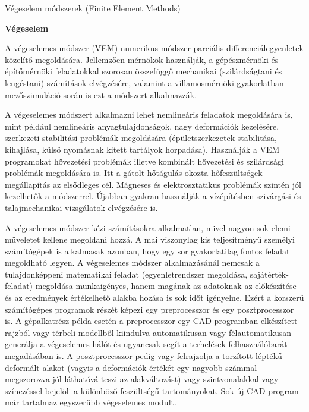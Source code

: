

Végeselem módszerek (Finite Element Methods)

\textbf{Végeselem}

A végeselemes módszer (VEM) numerikus módszer parciális differenciálegyenletek közelítő megoldására. Jellemzően mérnökök használják, a gépészmérnöki és építőmérnöki feladatokkal szorosan összefüggő mechanikai (szilárdságtani és lengéstani) számítások elvégzésére, valamint a villamosmérnöki gyakorlatban mezőszimuláció során is ezt a módszert alkalmazzák.

A végeselemes módszert alkalmazni lehet nemlineáris feladatok megoldására is, mint például nemlineáris anyagtulajdonságok, nagy deformációk kezelésére, szerkezeti stabilitási problémák megoldására (épületszerkezetek stabilitása, kihajlása, külső nyomásnak kitett tartályok horpadása). Használják a VEM programokat hővezetési problémák illetve kombinált hővezetési és szilárdsági problémák megoldására is. Itt a gátolt hőtágulás okozta hőfeszültségek megállapítás az elsődleges cél. Mágneses és elektrosztatikus problémák szintén jól kezelhetők a módszerrel. Újabban gyakran használják a vízépítésben szivárgási és talajmechanikai vizsgálatok elvégzésére is.

A végeselemes módszer kézi számításokra alkalmatlan, mivel nagyon sok elemi műveletet kellene megoldani hozzá. A mai viszonylag kis teljesítményű személyi számítógépek is alkalmasak azonban, hogy egy sor gyakorlatilag fontos feladat megoldható legyen. A végeselemes módszer alkalmazásánál nemcsak a tulajdonképpeni matematikai feladat (egyenletrendszer megoldása, sajátérték-feladat) megoldása munkaigényes, hanem magának az adatoknak az előkészítése és az eredmények értékelhető alakba hozása is sok időt igényelne. Ezért a korszerű számítógépes programok részét képezi egy preprocesszor és egy posztprocesszor is. A gépalkatrész példa esetén a preprocesszor egy CAD programban elkészített rajzból vagy térbeli modellből kiindulva automatikusan vagy félautomatikusan generálja a végeselemes hálót és ugyancsak segít a terhelések felhasználóbarát megadásában is. A posztprocesszor pedig vagy felrajzolja a torzított léptékű deformált alakot (vagyis a deformációk értékét egy nagyobb számmal megszorozva jól láthatóvá teszi az alakváltozást) vagy szintvonalakkal vagy színezéssel bejelöli a különböző feszültségű tartományokat. Sok új CAD program már tartalmaz egyszerűbb végeselemes modult.

